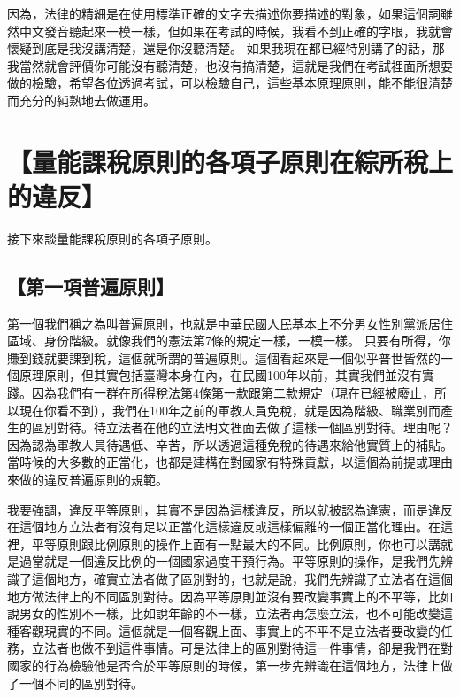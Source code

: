 \documentclass[]{ctexbook}
\begin{document}
因為，法律的精細是在使用標準正確的文字去描述你要描述的對象，如果這個詞雖然中文發音聽起來一模一樣，但如果在考試的時候，我看不到正確的字眼，我就會懷疑到底是我沒講清楚，還是你沒聽清楚。
如果我現在都已經特別講了的話，那我當然就會評價你可能沒有聽清楚，也沒有搞清楚，這就是我們在考試裡面所想要做的檢驗，希望各位透過考試，可以檢驗自己，這些基本原理原則，能不能很清楚而充分的純熟地去做運用。

\hypertarget{ux91cfux80fdux8ab2ux7a05ux539fux5247ux7684ux5404ux9805ux5b50ux539fux5247ux5728ux7d9cux6240ux7a05ux4e0aux7684ux9055ux53cd}{%
\section{【量能課稅原則的各項子原則在綜所稅上的違反】}\label{ux91cfux80fdux8ab2ux7a05ux539fux5247ux7684ux5404ux9805ux5b50ux539fux5247ux5728ux7d9cux6240ux7a05ux4e0aux7684ux9055ux53cd}}

接下來談量能課稅原則的各項子原則。

\hypertarget{ux7b2cux4e00ux9805ux666eux904dux539fux5247}{%
\subsection{【第一項普遍原則】}\label{ux7b2cux4e00ux9805ux666eux904dux539fux5247}}

第一個我們稱之為叫普遍原則，也就是中華民國人民基本上不分男女性別黨派居住區域、身份階級。就像我們的憲法第7條的規定一樣，一模一樣。
只要有所得，你賺到錢就要課到稅，這個就所謂的普遍原則。這個看起來是一個似乎普世皆然的一個原理原則，但其實包括臺灣本身在內，在民國100年以前，其實我們並沒有實踐。因為我們有一群在所得稅法第4條第一款跟第二款規定（現在已經被廢止，所以現在你看不到），我們在100年之前的軍教人員免稅，就是因為階級、職業別而產生的區別對待。待立法者在他的立法明文裡面去做了這樣一個區別對待。理由呢？因為認為軍教人員待遇低、辛苦，所以透過這種免稅的待遇來給他實質上的補貼。當時候的大多數的正當化，也都是建構在對國家有特殊貢獻，以這個為前提或理由來做的違反普遍原則的規範。

我要強調，違反平等原則，其實不是因為這樣違反，所以就被認為違憲，而是違反在這個地方立法者有沒有足以正當化這樣違反或這樣偏離的一個正當化理由。在這裡，平等原則跟比例原則的操作上面有一點最大的不同。比例原則，你也可以講就是過當就是一個違反比例的一個國家過度干預行為。平等原則的操作，是我們先辨識了這個地方，確實立法者做了區別對的，也就是說，我們先辨識了立法者在這個地方做法律上的不同區別對待。因為平等原則並沒有要改變事實上的不平等，比如說男女的性別不一樣，比如說年齡的不一樣，立法者再怎麼立法，也不可能改變這種客觀現實的不同。這個就是一個客觀上面、事實上的不平不是立法者要改變的任務，立法者也做不到這件事情。可是法律上的區別對待這一件事情，卻是我們在對國家的行為檢驗他是否合於平等原則的時候，第一步先辨識在這個地方，法律上做了一個不同的區別對待。
\end{document}
